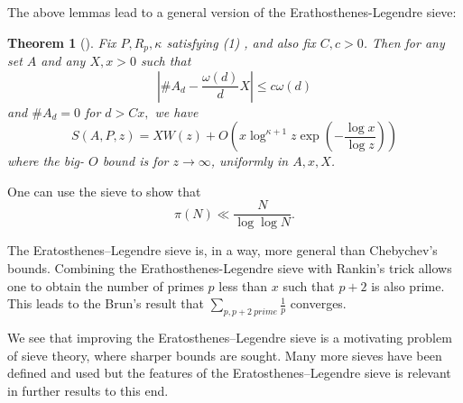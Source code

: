 \documentclass[11pt]{article}
\newtheorem{theorem}{Theorem}[section]
\theoremstyle{definition}
\begin{document}
The above lemmas lead to a general version of the  Erathosthenes-Legendre sieve:

\begin{theorem}[]
Fix $P, R_{p}, \kappa$ satisfying (1) , and also fix $C, c>0$. Then for any set $A$ and any $X, x>0$ such that
$$
\left|\# A_{d}-\frac{\omega(d)}{d} X\right| \leq c \omega(d)
$$
and $\# A_{d}=0$ for $d>C x,$ we have
$$
S(A, P, z)=X W(z)+O\left(x \log ^{\kappa+1} z \exp \left(-\frac{\log x}{\log z}\right)\right)
$$
where the big- $O$ bound is for $z \rightarrow \infty$, uniformly in $A, x, X$.
\end{theorem}

One can use the sieve to show that 
$$
\pi(N) \ll \frac{N}{\log \log N}.
$$

The Eratosthenes–Legendre sieve is, in a way, more general than Chebychev’s bounds. Combining the Erathosthenes-Legendre sieve with Rankin's trick allows one to obtain the number of primes $p$ less than $x$ such that $p+2$ is also prime. This leads to the Brun's result that $\sum_{p,p+2\ prime}\frac{1}{p}$ converges.\cite{cojocarumurty}\cite{kedlaya}

We see that improving the Eratosthenes–Legendre sieve is a motivating problem of sieve theory, where sharper bounds are sought. Many more sieves have been defined and used but the features of the Eratosthenes–Legendre sieve is relevant in further results to this end.

\printbibliography
\end{document}
